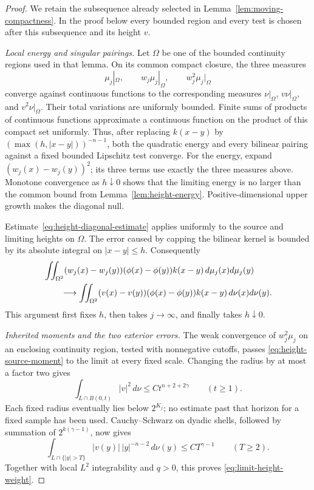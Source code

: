 \begin{proof}
We retain the subsequence already selected in
Lemma~\ref{lem:moving-compactness}.  In the proof below every bounded
region and every test is chosen after this subsequence and its height $v$.

\emph{Local energy and singular pairings.}
Let $\Omega$ be one of the bounded continuity regions used in that lemma.
On its common compact closure, the three measures
\[
 \mu_j|_\Omega,\qquad w_j\mu_j|_\Omega,
       \qquad w_j^2\mu_j|_\Omega
\]
converge against continuous functions to the corresponding measures
$\nu|_\Omega$, $v\nu|_\Omega$, and $v^2\nu|_\Omega$.
Their total variations are uniformly bounded.  Finite sums of products of
continuous functions approximate a continuous function on the product of
this compact set uniformly.  Thus, after replacing $k(x-y)$ by
$(\max(h,|x-y|))^{-n-1}$, both the quadratic energy and every bilinear
pairing against a fixed bounded Lipschitz test converge.  For the energy,
expand $(w_j(x)-w_j(y))^2$; its three terms use exactly the three measures
above.  Monotone convergence as $h\downarrow0$ shows that the limiting
energy is no larger than the common bound from
Lemma~\ref{lem:height-energy}.  Positive-dimensional upper growth makes
the diagonal null.

Estimate~\eqref{eq:height-diagonal-estimate} applies uniformly to the
source and limiting heights on $\Omega$.  The error caused by capping the
bilinear kernel is bounded by its absolute integral on $|x-y|\le h$.
Consequently
\begin{align}\label{eq:height-local-bilinear-limit}
 &\iint_{\Omega^2}(w_j(x)-w_j(y))(\phi(x)-\phi(y))k(x-y)
       \,d\mu_j(x)d\mu_j(y)\\
 &\qquad\longrightarrow
 \iint_{\Omega^2}(v(x)-v(y))(\phi(x)-\phi(y))k(x-y)
       \,d\nu(x)d\nu(y).\notag
\end{align}
This argument first fixes $h$, then takes $j\to\infty$, and finally takes
$h\downarrow0$.

\emph{Inherited moments and the two exterior errors.}
The weak convergence of $w_j^2\mu_j$ on an enclosing continuity region,
tested with nonnegative cutoffs, passes
\eqref{eq:height-source-moment} to the limit at every fixed scale.  Changing
the radius by at most a factor two gives
\begin{equation}\label{eq:limiting-height-moments}
 \int_{L\cap B(0,t)}|v|^2\,d\nu\le C t^{n+2+2\gamma}
 \qquad(t\ge1).
\end{equation}
Each fixed radius eventually lies below $2^{K_j}$; no estimate past that
horizon for a fixed sample has been used.  Cauchy--Schwarz on dyadic shells,
followed by summation of $2^{k(\gamma-1)}$, now gives
\begin{equation}\label{eq:limiting-height-tail-bound}
 \int_{L\cap\{|y|>T\}} |v(y)|\,|y|^{-n-2}\,d\nu(y)
       \le C T^{\gamma-1}\qquad(T\ge2).
\end{equation}
Together with local $L^2$ integrability and $q>0$, this proves
\eqref{eq:limit-height-weight}.


\end{proof}

